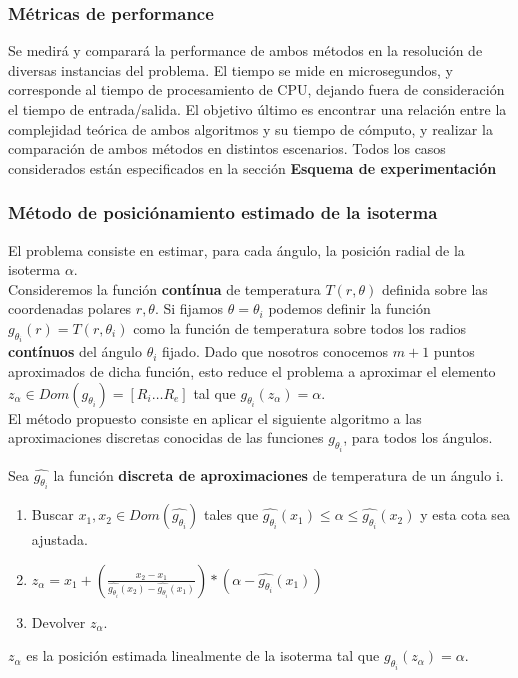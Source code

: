 \subsubsection{Métricas de performance}

Se medir\'a y comparar\'a la performance de ambos m\'etodos en la resoluci\'on de diversas instancias del problema. El tiempo se mide en microsegundos, y corresponde al tiempo de procesamiento de CPU, dejando fuera de consideraci\'on el tiempo de entrada/salida. El objetivo \'ultimo es encontrar una relaci\'on entre la complejidad te\'orica de ambos algoritmos y su tiempo de c\'omputo, y realizar la comparaci\'on de ambos m\'etodos en distintos escenarios. Todos los casos considerados est\'an especificados en la secci\'on \textbf{Esquema de experimentaci\'on}

\subsubsection{Método de posiciónamiento estimado de la isoterma}
El problema consiste en estimar, para cada ángulo, la posición radial de la isoterma \texttt{$\alpha$}.\\
Consideremos la función \textbf{contínua} de temperatura $T(r,\theta)$ definida sobre las coordenadas polares $r,\theta$. Si fijamos $\theta = \theta_i$ podemos definir la función $g_{\theta_i}(r) = T(r,\theta_i)$ como la función de temperatura sobre todos los radios \textbf{contínuos} del ángulo $\theta_i$ fijado. Dado que nosotros conocemos $m+1$ puntos aproximados de dicha función, esto reduce el problema a aproximar el elemento $ z_\alpha \in Dom(g_{\theta_i}) = { [R_i \dots R_e] }$ tal que $g_{\theta_i}(z_\alpha) = \alpha$. \\
El método propuesto consiste en aplicar el siguiente algoritmo a las aproximaciones discretas conocidas de las funciones $g_{\theta_i}$, para todos los ángulos.

\begin{proposition}
    Sea $\hat{g_{\theta_i}}$ la función \textbf{discreta de aproximaciones} de temperatura de un ángulo i.
    \begin{enumerate}
        \item Buscar $ x_1, x_2 \in Dom(\hat{g_{\theta_i}}) $ tales que $ \hat{g_{\theta_i}}(x_1) \leq \alpha \leq \hat{g_{\theta_i}}(x_2)$ y esta cota sea ajustada.
        
        \item $z_\alpha = x_1 + \left(\frac{x_2 - x_1}{\hat{g_{\theta_i}}(x_2) - \hat{g_{\theta_i}}(x_1)}\right) * (\alpha - \hat{g_{\theta_i}}(x_1))$

        \item Devolver $z_\alpha$.
    \end{enumerate}
    $z_\alpha$ es la posición estimada linealmente de la isoterma tal que $g_{\theta_i}(z_\alpha) = \alpha$.
\end{proposition}

